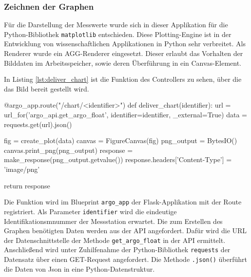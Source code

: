 \subsubsection{Zeichnen der Graphen} \label{sec:ImplementierungPLOTS}


Für die Darstellung der Messwerte wurde sich in dieser Applikation für die Python-Bibliothek \texttt{matplotlib} entschieden.  Diese Plotting-Engine ist in der Entwicklung von wissenschaftlichen Applikationen in Python sehr verbreitet. 
Als Renderer wurde ein AGG-Renderer eingesetzt. Dieser erlaubt das Vorhalten der Bilddaten im Arbeitsspeicher, sowie deren Überführung in ein Canvas-Element.

In Listing \ref{lst:deliver_chart} ist die Funktion des Controllers zu sehen, über die das Bild bereit gestellt wird.

\begin{python}[label={lst:deliver_chart}, caption={Ausliefern eines geploteten Bildes mit Flask}]
@argo_app.route("/chart/<identifier>")
def deliver_chart(identifier):
    url = url_for('argo_api.get_argo_float', identifier=identifier, _external=True)
    data = requests.get(url).json()

    fig = create_plot(data)
    canvas = FigureCanvas(fig)
    png_output = BytesIO()
    canvas.print_png(png_output)
    response = make_response(png_output.getvalue())
    response.headers['Content-Type'] = 'image/png'

    return response
\end{python}

Die Funktion wird im Blueprint \texttt{argo\_app} der Flask-Applikation mit der Route registriert. Als Parameter \texttt{identifier}  wird die eindeutige Identifikationsmnummer der Messstation erwartet. Die zum Erstellen des Graphen benötigten Daten werden aus der API angefordert. Dafür wird die URL der Datenschnittstelle der Methode \texttt{get\_argo\_float} in der API ermittelt. Anschließend wird unter Zuhilfenahme der Python-Bibliothek \texttt{requests} der Datensatz über einen GET-Request angefordert. Die Methode \texttt{.json()} überführt die Daten von Json in eine Python-Datenstruktur. 

